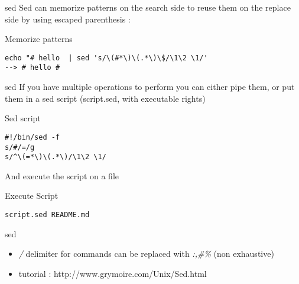 \begin{frame}[fragile]{sed}
Sed can memorize patterns on the search side to reuse them on the replace side by using escaped parenthesis :
\pause
  \begin{exampleblock}{Memorize patterns}
    \begin{lstlisting}[showstringspaces=false]
echo "# hello  | sed 's/\(#*\)\(.*\)\$/\1\2 \1/'
--> # hello #
    \end{lstlisting}
  \end{exampleblock}
\end{frame}

\begin{frame}[fragile]{sed}
If you have multiple operations to perform you can either pipe them, or put them in a sed script (script.sed, with executable rights)
\pause
  \begin{exampleblock}{Sed script}
    \begin{lstlisting}[showstringspaces=false,basicstyle=\tiny]
#!/bin/sed -f
s/#/=/g
s/^\(=*\)\(.*\)/\1\2 \1/
    \end{lstlisting}
  \end{exampleblock}

\pause
And execute the script on a file
  \begin{exampleblock}{Execute Script}
    \begin{lstlisting}[showstringspaces=false]
script.sed README.md
    \end{lstlisting}
  \end{exampleblock}
\end{frame}


\begin{frame}[fragile]{sed}
\begin{itemize}
\item\emph{/} delimiter for commands can be replaced with \emph{:,\#\%} (non exhaustive)
\pause

\item tutorial : http://www.grymoire.com/Unix/Sed.html
\end{itemize}
\end{frame}
